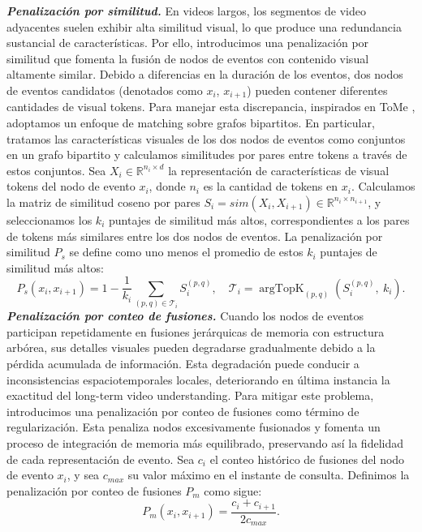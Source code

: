 \textbf{\textit{Penalización por similitud.}} En videos largos, los segmentos de video adyacentes suelen exhibir alta similitud visual, lo que produce una redundancia sustancial de características. Por ello, introducimos una penalización por similitud que fomenta la fusión de nodos de eventos con contenido visual altamente similar. Debido a diferencias en la duración de los eventos, dos nodos de eventos candidatos (denotados como $x_i$, $x_{i+1}$) pueden contener diferentes cantidades de visual tokens. Para manejar esta discrepancia, inspirados en ToMe \cite{bolya2022tome}, adoptamos un enfoque de matching sobre grafos bipartitos. En particular, tratamos las características visuales de los dos nodos de eventos como conjuntos en un grafo bipartito y calculamos similitudes por pares entre tokens a través de estos conjuntos.
%
Sea $X_i \in \mathbb{R}^{n_i \times d}$ la representación de características de visual tokens del nodo de evento $x_i$, donde $n_i$ es la cantidad de tokens en $x_i$. Calculamos la matriz de similitud coseno por pares $S_i = sim(X_i, X_{i+1}) \in \mathbb{R}^{n_i \times n_{i+1}}$, y seleccionamos los $k_i$ puntajes de similitud más altos, correspondientes a los pares de tokens más similares entre los dos nodos de eventos. La penalización por similitud $P_s$ se define como uno menos el promedio de estos $k_i$ puntajes de similitud más altos:
\begin{equation}
P_s(x_i, x_{i+1}) = 1 - \frac{1}{k_i} \sum_{(p,q) \in \mathcal{T}_i} S_{i}^{(p,q)}, \quad  \mathcal{T}_i = \operatorname{argTopK}_{(p,q)}(S_{i}^{(p, q)},\ k_i).
\end{equation}
%
\textbf{\textit{Penalización por conteo de fusiones.}} Cuando los nodos de eventos participan repetidamente en fusiones jerárquicas de memoria con estructura arbórea, sus detalles visuales pueden degradarse gradualmente debido a la pérdida acumulada de información. Esta degradación puede conducir a inconsistencias espaciotemporales locales, deteriorando en última instancia la exactitud del long-term video understanding. Para mitigar este problema, introducimos una penalización por conteo de fusiones como término de regularización. Esta penaliza nodos excesivamente fusionados y fomenta un proceso de integración de memoria más equilibrado, preservando así la fidelidad de cada representación de evento.
%
Sea $c_i$ el conteo histórico de fusiones del nodo de evento $x_i$, y sea $c_{max}$ su valor máximo en el instante de consulta. Definimos la penalización por conteo de fusiones $P_m$ como sigue:
\begin{equation}
P_m(x_i,x_{i+1})=\frac{c_i+c_{i+1}}{2c_{max}}.
\end{equation}
